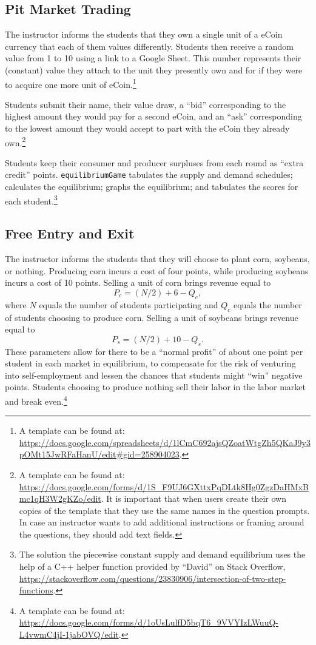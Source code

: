 \documentclass[
]{article}
\begin{document}
\hypertarget{pit-market-trading}{%
\subsection{Pit Market Trading}\label{pit-market-trading}}

The instructor informs the students that they own a single unit of a
eCoin currency that each of them values differently. Students then
receive a random value from 1 to 10 using a link to a Google Sheet. This
number represents their (constant) value they attach to the unit they
presently own and for if they were to acquire one more unit of
eCoin.\footnote{A template can be found at:
  \url{https://docs.google.com/spreadsheets/d/1lCmC692ajsQZoatWtgZh5QKaJ9y3pOMt15JwRFaHanU/edit\#gid=258904023}.}

Students submit their name, their value draw, a ``bid'' corresponding to
the highest amount they would pay for a second eCoin, and an ``ask''
corresponding to the lowest amount they would accept to part with the
eCoin they already own.\footnote{A template can be found at:
  \url{https://docs.google.com/forms/d/1S_F9UJ6GXttxPqDLtk8Hg0ZgzDaHMxBmc1qH3W2gKZo/edit}.
  It is important that when users create their own copies of the
  template that they use the same names in the question prompts. In case
  an instructor wants to add additional instructions or framing around
  the questions, they should add text fields.}

Students keep their consumer and producer surpluses from each round as
``extra credit'' points. \texttt{equilibriumGame} tabulates the supply
and demand schedules; calculates the equilibrium; graphs the
equilibrium; and tabulates the scores for each student.\footnote{The
  solution the piecewise constant supply and demand equilibrium uses the
  help of a C++ helper function provided by ``David'' on Stack Overflow,
  \url{https://stackoverflow.com/questions/23830906/intersection-of-two-step-functions}.}

\hypertarget{free-entry-and-exit}{%
\subsection{Free Entry and Exit}\label{free-entry-and-exit}}

The instructor informs the students that they will choose to plant corn,
soybeans, or nothing. Producing corn incurs a cost of four points, while
producing soybeans incurs a cost of 10 points. Selling a unit of corn
brings revenue equal to \[P_c = (N/2) + 6 - Q_c,\] where \(N\) equals
the number of students participating and \(Q_c\) equals the number of
students choosing to produce corn. Selling a unit of soybeans brings
revenue equal to \[P_s = (N/2) + 10 - Q_s.\] These parameters allow for
there to be a ``normal profit'' of about one point per student in each
market in equilibrium, to compensate for the risk of venturing into
self-employment and lessen the chances that students might ``win''
negative points. Students choosing to produce nothing sell their labor
in the labor market and break even.\footnote{A template can be found at:
  \url{https://docs.google.com/forms/d/1oUsLulfD5bqT6_9VVYIzLWuuQ-L4vwmC4jI-1jabOVQ/edit}.}
\end{document}
